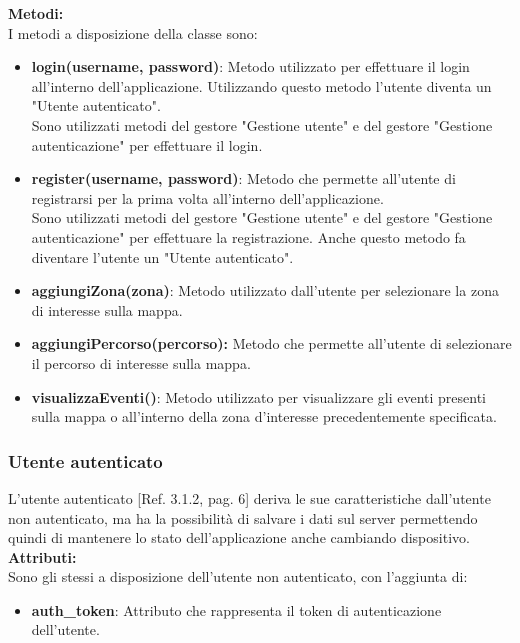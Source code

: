 \documentclass{article}
\begin{document}
\textbf{Metodi:}\\

I metodi a disposizione della classe sono:
\begin{itemize}
    \item \textbf{login(username, password)}: Metodo utilizzato per effettuare il login all'interno dell'applicazione. Utilizzando questo metodo l'utente diventa un "Utente autenticato".\\Sono utilizzati metodi del gestore "Gestione utente" e del gestore "Gestione autenticazione" per effettuare il login.
    \item \textbf{register(username, password)}: Metodo che permette all'utente di registrarsi per la prima volta all'interno dell'applicazione.\\Sono utilizzati metodi del gestore "Gestione utente" e del gestore "Gestione autenticazione" per effettuare la registrazione. Anche questo metodo fa diventare l'utente un "Utente autenticato".
    \item \textbf{aggiungiZona(zona)}: Metodo utilizzato dall'utente per selezionare la zona di interesse sulla mappa.\\
    \item \textbf{aggiungiPercorso(percorso):} Metodo che permette all'utente di selezionare il percorso di interesse sulla mappa.
    \item \textbf{visualizzaEventi()}: Metodo utilizzato per visualizzare gli eventi presenti sulla mappa o all'interno della zona d'interesse precedentemente specificata.
\end{itemize} 

\subsubsection{Utente autenticato}

L'utente autenticato [Ref. 3.1.2, pag. 6] deriva le sue caratteristiche dall'utente non autenticato, ma ha la possibilità di salvare i dati sul server permettendo quindi di mantenere lo stato dell'applicazione anche cambiando dispositivo.\\

\textbf{Attributi:}\\
Sono gli stessi a disposizione dell'utente non autenticato, con l'aggiunta di:
\begin{itemize}
    \item \textbf{auth\_token}: Attributo che rappresenta il token di autenticazione dell'utente.
\end{itemize}
\end{document}
